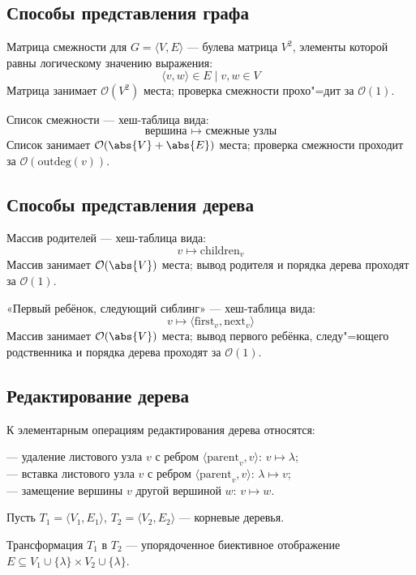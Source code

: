\subsection{Способы представления графа}

{\bold Матрица смежности} для $G=\langle V,E\rangle$ --- булева матрица $V^2$, элементы которой равны логическому значению выражения:
$$\langle v,w\rangle\in E\mid v,w\in V$$
Матрица занимает $\mathcal{O}(V^2)$ места; проверка смежности прохо"=дит за $\mathcal{O}(1)$.

{\bold Список смежности} --- хеш-таблица вида:
$$\text{вершина }\mapsto\text{ смежные узлы}$$
Список занимает $\mathcal{O}(\abs{V}+\abs{E})$ места; проверка смежности проходит за $\mathcal{O}(\text{outdeg}(v))$.

\subsection{Способы представления дерева}

{\bold Массив родителей} --- хеш-таблица вида:
$$v\mapsto\text{children}_v$$
Массив занимает $\mathcal{O}(\abs{V})$ места; вывод родителя и порядка дерева проходят за $\mathcal{O}(1)$.

{\bold «Первый ребёнок, следующий сиблинг»} --- хеш-таблица вида:
$$v\mapsto\langle\text{first}_v,\text{next}_v\rangle$$
Массив занимает $\mathcal{O}(\abs{V})$ места; вывод первого ребёнка, следу"=ющего родственника и порядка дерева проходят за $\mathcal{O}(1)$.

\subsection{Редактирование дерева}

К {\bold элементарным операциям} редактирования дерева относятся:

--- {\ital удаление} листового узла $v$ с ребром $\langle\text{parent}_v,v\rangle$: $v\mapsto\lambda$;\\
--- {\ital вставка} листового узла $v$ с ребром $\langle\text{parent}_v,v\rangle$: $\lambda\mapsto v$;\\
--- {\ital замещение} вершины $v$ другой вершиной $w$: $v\mapsto w$.

Пусть $T_1=\langle V_1,E_1\rangle$, $T_2=\langle V_2,E_2\rangle$ --- корневые деревья.

{\ital Трансформация} $T_1$ в $T_2$ --- упорядоченное биективное отображение $E\subseteq V_1\cup\{\lambda\}\times V_2\cup\{\lambda\}$.

